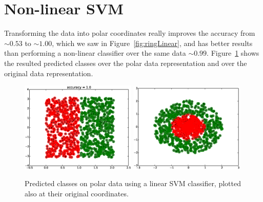 \documentclass[a4paper,10pt]{article}
\begin{document}
\section{Non-linear SVM}
Transforming the data into polar coordinates really improves the accuracy from $\sim 0.53$ to $\sim 1.00$, which we saw in Figure~\ref{fig:ringLinear}, and has better results than performing a non-linear classifier over the same data $\sim 0.99$. Figure~\ref{fig:linearSVMonPolar} shows the resulted predicted classes over the polar data representation and over the original data representation.
\begin{figure}[ht!]
    \centering
    \includegraphics[width=0.49\textwidth]{linearSVMonPolar.eps}
    \includegraphics[width=0.49\textwidth]{final.eps}
    \caption{Predicted classes on polar data using a linear SVM classifier, plotted also at their original coordinates.}
    \label{fig:linearSVMonPolar}
\end{figure}

%
%
\end{document}
